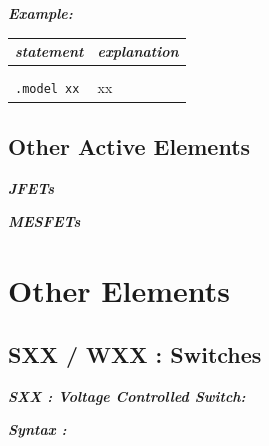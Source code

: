 \textbf{\textit{Example:}}

\begin{longtable}{l l}
\textit{statement} & \textit{explanation} \\ \hline \\ %
			\begin{minipage}{15em}{\texttt{xx}\\ 
			\texttt{.model xx}}\end{minipage}
			& \begin{minipage}{15em}{{\small xx}}\end{minipage} 
\end{longtable}


\subsection{Other Active Elements}
\label{subsec_sceadm_otheractiveelements}

\textbf{\textit{JFETs}}


\textbf{\textit{MESFETs}}


\newpage
\section{Other Elements}
\label{sec_sceadm_otherelements}

\subsection{SXX / WXX : Switches}
\label{subsec_sceadm_switches}

\textbf{\textit{SXX : Voltage Controlled Switch:}}


\textbf{\textit{Syntax :}}


